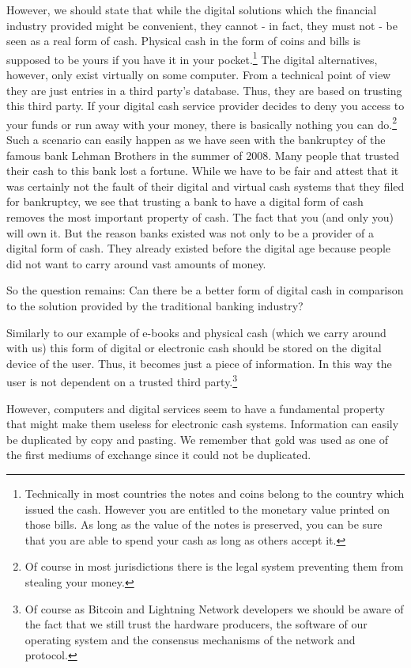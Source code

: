 \documentclass[ebook,12pt,oneside,openany]{memoir}
\begin{document}
However, we should state that while the digital solutions which the financial industry provided might be convenient, they cannot - in fact, they must not - be seen as a real form of cash.
Physical cash in the form of coins and bills is supposed to be yours if you have it in your pocket.\footnote{Technically in most countries the notes and coins belong to the country which issued the cash. 
However you are entitled to the monetary value printed on those bills. As long as the value of the notes is preserved, you can be sure that you are able to spend your cash as long as others accept it.}
The digital alternatives, however, only exist virtually on some computer.
From a technical point of view they are just entries in a third party's database.
Thus, they are based on trusting this third party.
If your digital cash service provider decides to deny you access to your funds or run away with your money, there is basically nothing you can do.\footnote{Of course in most jurisdictions there is the legal system preventing them from stealing your money.}
Such a scenario can easily happen as we have seen with the bankruptcy of the famous bank Lehman Brothers in the summer of 2008. Many people that trusted their cash to this bank lost a fortune.
While we have to be fair and attest that it was certainly not the fault of their digital and virtual cash systems that they filed for bankruptcy, we see that trusting a bank to have a digital form of cash removes the most important property of cash.
The fact that you (and only you) will own it.
But the reason banks existed was not only to be a provider of a digital form of cash.
They already existed before the digital age because people did not want to carry around vast amounts of money.

So the question remains: Can there be a better form of digital cash in comparison to the solution provided by the traditional banking industry? 

Similarly to our example of e-books and physical cash (which we carry around with us) this form of digital or electronic cash should be stored on the digital device of the user.
Thus, it becomes just a piece of information.
In this way the user is not dependent on a trusted third party.\footnote{Of course as Bitcoin and Lightning Network developers we should be aware of the fact that we still trust the hardware producers, the software of our operating system and the consensus mechanisms of the network and protocol.}

However, computers and digital services seem to have a fundamental property that might make them useless for electronic cash systems.
Information can easily be duplicated by copy and pasting.
We remember that gold was used as one of the first mediums of exchange since it could not be duplicated.
\end{document}
